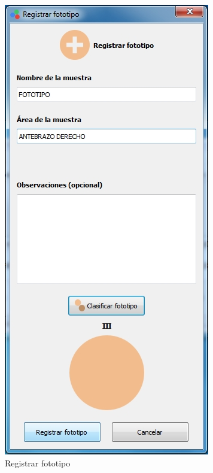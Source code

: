 \begin{figure}[H]
  \centering
  \includegraphics[width=.5\linewidth]{./img/registrar-fototipo2.jpg}
\caption[]{Registrar fototipo\label{fig:registrar-fototipo2}}
\end{figure}
\vfill
\newpage	

